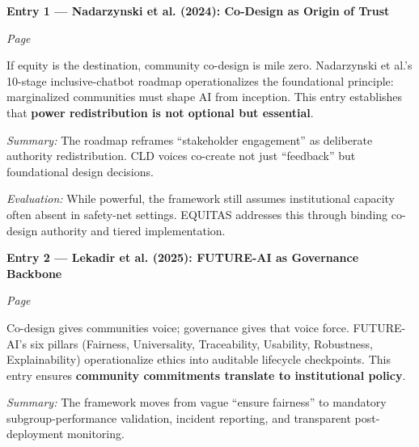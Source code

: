 \documentclass[11pt,twoside]{article}
\begin{document}
\noindent\textbf{\large Entry 1 --- Nadarzynski et al. (2024): Co-Design as Origin of Trust}\hfill

\textit{Page \pageref{entry1}}

\vspace{0.2cm}

\noindent If equity is the destination, community co-design is mile zero. Nadarzynski et al.'s 10-stage inclusive-chatbot roadmap operationalizes the foundational principle: marginalized communities must shape AI from inception. This entry establishes that \textbf{power redistribution is not optional but essential}.

\vspace{0.3cm}

\noindent \hspace{1cm} \textit{Summary:} The roadmap reframes ``stakeholder engagement'' as deliberate authority redistribution. CLD voices co-create not just ``feedback'' but foundational design decisions.

\vspace{0.1cm}

\noindent \hspace{1cm} \textit{Evaluation:} While powerful, the framework still assumes institutional capacity often absent in safety-net settings. EQUITAS addresses this through binding co-design authority and tiered implementation.

\vspace{0.5cm}

\noindent\textbf{\large Entry 2 --- Lekadir et al. (2025): FUTURE-AI as Governance Backbone}\hfill

\textit{Page \pageref{entry2}}

\vspace{0.2cm}

\noindent Co-design gives communities voice; governance gives that voice force. FUTURE-AI's six pillars (Fairness, Universality, Traceability, Usability, Robustness, Explainability) operationalize ethics into auditable lifecycle checkpoints. This entry ensures \textbf{community commitments translate to institutional policy}.

\vspace{0.3cm}

\noindent \hspace{1cm} \textit{Summary:} The framework moves from vague ``ensure fairness'' to mandatory subgroup-performance validation, incident reporting, and transparent post-deployment monitoring.
\end{document}

